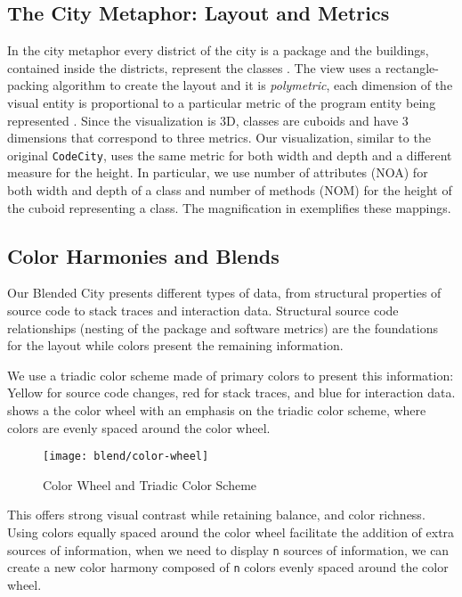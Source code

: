 \subsection{The City Metaphor: Layout and Metrics}

In the city metaphor every  district of the city is a package and the buildings, contained inside the districts, represent the classes \cite{Wett2007}.
The view uses a rectangle-packing algorithm to create the layout and it is \emph{polymetric}, \ie each dimension of the visual entity is proportional to a particular metric of the program entity being represented \cite{Lanz2004}.
Since the visualization is 3D, classes are cuboids and have 3 dimensions that correspond to three metrics.
Our visualization, similar to the original \texttt{CodeCity}, uses the same metric for both width and depth and a different measure for the height.
In particular, we use number of attributes (\ie NOA) for both width and depth of a class and number of methods (\ie NOM) for the height of the cuboid representing a class.
The magnification in  exemplifies these mappings.

\subsection{Color Harmonies and Blends}

Our Blended City presents different types of data, from structural properties of source code to stack traces and interaction data.
Structural source code relationships (\ie nesting of the package and software metrics) are the foundations for the layout while colors present the remaining information.

We use a triadic color scheme made of primary colors to present this information: Yellow for source code changes, red for stack traces, and blue for interaction data.
 shows a the color wheel with an emphasis on the triadic color scheme, where colors are evenly spaced around the color wheel.

\begin{figure}[ht]
\centering
\texttt{[image: blend/color-wheel]}
\caption{Color Wheel and Triadic Color Scheme}
\label{fig:color-wheel}
\end{figure}

This offers strong visual contrast while retaining balance, and color richness.
Using colors equally spaced around the color wheel facilitate the addition of extra sources of information, \ie when we need to display \texttt{n} sources of information, we can create a new color harmony composed of \texttt{n} colors evenly spaced around the color wheel.

